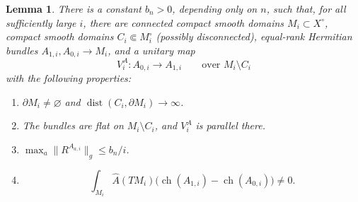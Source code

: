 \documentclass[12pt,reqno]{amsart}
\numberwithin{equation}{section}
\newtheorem{lemma}[theorem]{Lemma}
\theoremstyle{definition}
\newcommand{\Ahat}{\widehat A}
\newcommand{\ch}{\operatorname{ch}}
\newcommand{\dist}{\operatorname{dist}}
\begin{document}
\begin{lemma}\label{lem:K-compact}
There is a constant $b_n>0$, depending only on $n$, such that, for all
sufficiently large $i$, there are connected compact smooth domains
$M_i\subset X^\circ$, compact smooth domains
$C_i\Subset M_i^\circ$ (possibly disconnected), equal-rank Hermitian
bundles $A_{1,i},A_{0,i}\to M_i$, and a unitary map
\[
 V_i^A:A_{0,i}\longrightarrow A_{1,i}
 \qquad\text{over }M_i\setminus C_i
\]
with the following properties:
\begin{enumerate}[label=\textup{(K\arabic*)},ref=\textup{(K\arabic*)},
                  leftmargin=3.4em]
\item\label{K:distance}
$\partial M_i\ne\varnothing$ and
$\dist(C_i,\partial M_i)\to\infty$.

\item\label{K:exterior}
The bundles are flat on $M_i\setminus C_i$, and $V_i^A$ is parallel
there.

\item
$\max_a\|R^{A_{a,i}}\|_g\leq b_n/i$.

\item\label{K:pairing}
\[
 \int_{M_i}\Ahat(TM_i)
 \bigl(\ch(A_{1,i})-\ch(A_{0,i})\bigr)\ne0.
\]
\end{enumerate}
\end{lemma}
\end{document}
